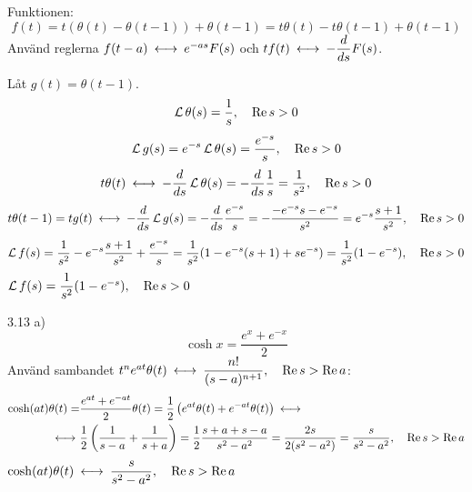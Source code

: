 \begin{task}{3.12}
	Funktionen:
	\[f(t)=t(\theta(t)-\theta(t-1))+\theta(t-1)=t\theta(t)-t\theta(t-1)+\theta(t-1)\]
	Använd reglerna $f(t-a) \llra e^{-as}F(s)$ och $tf(t) \llra -\dfrac{d}{ds}F(s)$.
	
	Låt $g(t)=\theta(t-1)$.
	\[\operatorname{\mathcal{L}}\theta(s)=\frac{1}{s}, \quad \operatorname{Re} s > 0\]
	\[\operatorname{\mathcal{L}} g(s)=e^{-s}\operatorname{\mathcal{L}}\theta(s)=\frac{e^{-s}}{s}, \quad \operatorname{Re} s > 0\]
	\[t\theta(t)\llra -\dfrac{d}{ds}\laplace\theta(s)=-\dfrac{d}{ds}\frac{1}{s}=\frac{1}{s^2}\cond{\Re s > 0}\]
	\[t\theta(t-1)=
	tg(t)\llra 
	-\dfrac{d}{ds}\laplace g(s)=
	-\dfrac{d}{ds}\frac{e^{-s}}{s}=
	-\frac{-e^{-s}s-e^{-s}}{s^2}=
	e^{-s}\frac{s+1}{s^2}\cond{\Re s > 0}\]
	\[\operatorname{\mathcal{L}} f(s)=\frac{1}{s^2}-e^{-s}\frac{s+1}{s^2}+\frac{e^{-s}}{s}=
	\frac{1}{s^2}(1-e^{-s}(s+1)+se^{-s})=
	\frac{1}{s^2}(1-e^{-s}), \quad \operatorname{Re} s > 0\]
	\ans $\operatorname{\mathcal{L}} f(s)=\dfrac{1}{s^2}(1-e^{-s}), \quad \operatorname{Re} s > 0$
\end{task}

\begin{task}{3.13 a)}
	\[\cosh x=\dfrac{e^x+e^{-x}}{2}\]
	Använd sambandet $t^ne^{at}\theta(t)\llra \dfrac{n!}{(s-a)^{n+1}}\cond{\Re s > \Re a}$:
	\begin{align*}
	\cosh(at)\theta(t) =
	&\frac{e^{at}+e^{-at}}{2}\theta(t) =
	\frac{1}{2}\left(e^{at}\theta(t)+e^{-at}\theta(t)\right) \llra \\ \llra
	&\frac{1}{2}\left(\frac{1}{s-a}+\frac{1}{s+a}\right)=
	\frac{1}{2}\*\frac{s+a+s-a}{s^2-a^2}=
	\frac{2s}{2(s^2-a^2)}=
	\frac{s}{s^2-a^2}\cond{\Re s > \Re a}
	\end{align*}
	\ans $\cosh(at)\theta(t)\llra\dfrac{s}{s^2-a^2}\cond{\Re s > \Re a}$
\end{task}
